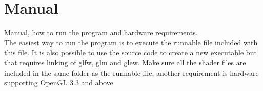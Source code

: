 \documentclass[a4paper,12pt,twoside,final]{report}
\begin{document}
\newpage


\appendix
\chapter{Manual}
Manual, how to run the program and hardware requirements. \\
\noindent The easiest way to run the program is to execute the runnable file included with this file. It is also possible to use the source code to create a new executable but that requires linking of glfw, glm and glew. Make sure all the shader files are included in the same folder as the runnable file, another requirement is hardware supporting OpenGL 3.3 and above.
\end{document}
